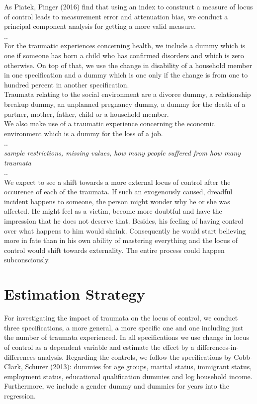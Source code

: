 \documentclass[12pt,a4paper,fleqn]{article}
\begin{document}
As Piatek, Pinger (2016) find that using an index to construct a measure of locus of control leads to measurement error and attenuation bias, we conduct a principal component analysis for getting a more valid measure. \\
..\\
For the traumatic experiences concerning health, we include a dummy which is one if someone has born a child who has confirmed disorders and which is zero otherwise. On top of that, we use the change in disability of a household member in one specification and a dummy which is one only if the change is from one to hundred percent in another specification. \\
Traumata relating to the social environment are a divorce dummy, a relationship breakup dummy, an unplanned pregnancy dummy, a dummy for the death of a partner, mother, father, child or a household member.\\
We also make use of a traumatic experience concerning the economic environment which is a dummy for the loss of a job. \\
..\\
\textit{sample restrictions, missing values, how many people suffered from how many traumata} \\
..\\
We expect to see a shift towards a more external locus of control after the occurence of each of the traumata. If such an exogenously caused, dreadful incident happens to someone, the person might wonder why he or she was affected. He might feel as a victim, become more doubtful and have the impression that he does not deserve that. Besides, his feeling of having control over what happens to him would shrink. Consequently he would start believing more in fate than in his own ability of mastering everything and the locus of control would shift towards externality. The entire process could happen subconsciously. \\

\section{Estimation Strategy}
For investigating the impact of traumata on the locus of control, we conduct three specifications, a more general, a more specific one and one
including just the number of traumata experienced. In all specifications we
use change in locus of control as a dependent variable and estimate the effect by a differences-in-differences analysis. 
Regarding the controls, we follow the specifications by Cobb-Clark, Schurer (2013):
dummies for age groups, marital status, immigrant status, employment status,
educational qualification dummies and log household income. Furthermore, we
include a gender dummy and dummies for years into the regression.
\end{document}
